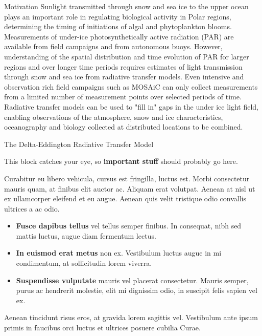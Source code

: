 \documentclass[final]{beamer}
\newlength{\colwidth}
\begin{document}
\begin{frame}[t,fragile]
\begin{columns}[t]
\begin{column}{\colwidth}
\begin{block}{Motivation}
    Sunlight transmitted through snow and sea ice to the upper ocean plays an
    important role in regulating biological activity in Polar regions,
    determining the timing of initiations of algal and phytoplankton blooms.
    Measurements of under-ice photosynthetically active radiation (PAR) are
    available from field campaigns and from autonomous buoys. However,
    understanding of the spatial distribution and time evolution of PAR for
    larger regions and over longer time periods requires estimates of light
    transmission through snow and sea ice from radiative transfer models. Even
    intensive and observation rich field campaigns such as MOSAiC can only
    collect measurements from a limited number of measurement points over
    selected periods of time. Radiative transfer models can be used to "fill
    in" gaps in the under ice light field, enabling observations of the
    atmosphere, snow and ice characteristics, oceanography and biology
    collected at distributed locations to be combined.

  \end{block}

  \begin{block}{The Delta-Eddington Radiative Transfer Model}

    This block catches your eye, so \textbf{important stuff} should probably go
    here.

    Curabitur eu libero vehicula, cursus est fringilla, luctus est. Morbi
    consectetur mauris quam, at finibus elit auctor ac. Aliquam erat volutpat.
    Aenean at nisl ut ex ullamcorper eleifend et eu augue. Aenean quis velit
    tristique odio convallis ultrices a ac odio.

    \begin{itemize}
      \item \textbf{Fusce dapibus tellus} vel tellus semper finibus. In
        consequat, nibh sed mattis luctus, augue diam fermentum lectus.
      \item \textbf{In euismod erat metus} non ex. Vestibulum luctus augue in
        mi condimentum, at sollicitudin lorem viverra.
      \item \textbf{Suspendisse vulputate} mauris vel placerat consectetur.
        Mauris semper, purus ac hendrerit molestie, elit mi dignissim odio, in
        suscipit felis sapien vel ex.
    \end{itemize}

    Aenean tincidunt risus eros, at gravida lorem sagittis vel. Vestibulum ante
    ipsum primis in faucibus orci luctus et ultrices posuere cubilia Curae.


\end{block}
\end{column}
\end{columns}
\end{frame}
\end{document}
